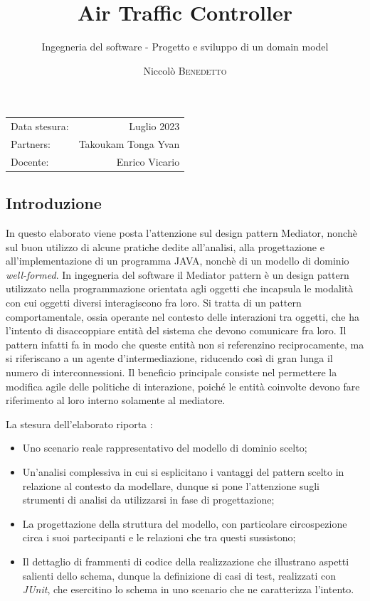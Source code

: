 \documentclass{article}
\title{Air Traffic Controller} %
\author{Ingegneria del software - Progetto e sviluppo di un domain model} %
\date{Niccolò \textsc{Benedetto}} %
\begin{document}
\maketitle

\begin{center}
\begin{tabular}{l r}
Data stesura: & Luglio 2023 \\%
Partners: & Takoukam Tonga Yvan \\ %

Docente: & Enrico Vicario %
\end{tabular}
\end{center}

\newpage

\begin{sloppy}
    

\section{Introduzione}
In questo elaborato viene posta l'attenzione sul design pattern Mediator, nonchè sul buon utilizzo di alcune pratiche dedite all'analisi, alla progettazione e 
all'implementazione di un programma JAVA, nonchè di un modello di dominio \textit{well-formed}.
\bigbreak
In ingegneria del software il Mediator pattern è un design pattern utilizzato nella programmazione orientata agli oggetti che incapsula le modalità con cui oggetti diversi interagiscono fra loro.
Si tratta di un pattern comportamentale, ossia operante nel contesto delle interazioni tra oggetti, che ha l'intento di disaccoppiare entità del sistema che devono comunicare fra loro. Il pattern infatti fa in modo che queste entità non si referenzino reciprocamente, ma si riferiscano a un agente d'intermediazione, riducendo così di gran lunga il numero di interconnessioni.
Il beneficio principale consiste nel permettere la modifica agile delle politiche di interazione, poiché le entità coinvolte devono fare riferimento al loro interno solamente al mediatore. 

\bigbreak
La stesura dell'elaborato riporta :
\begin{itemize}
\item Uno scenario reale rappresentativo del modello di dominio scelto;
\item Un'analisi complessiva in cui si esplicitano i vantaggi del pattern scelto in relazione al contesto da modellare, dunque si pone l'attenzione sugli strumenti di analisi da utilizzarsi in fase di progettazione;
\item La progettazione della struttura del modello, con particolare circospezione circa i suoi partecipanti e le relazioni che tra questi sussistono;
\item Il dettaglio di frammenti di codice della realizzazione che illustrano aspetti salienti dello schema, dunque la definizione di casi di test, realizzati con \textit{JUnit}, che esercitino lo schema in uno scenario che ne caratterizza l’intento.
\end{itemize}


\end{sloppy}
\end{document}
